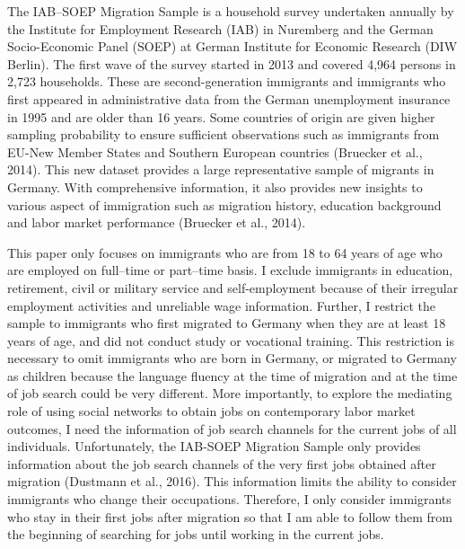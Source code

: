\documentclass[12pt,a4paper]{article}
\begin{document}
The IAB--SOEP Migration Sample is a household survey undertaken annually by the Institute for Employment Research (IAB) in Nuremberg and the German Socio-Economic Panel (SOEP) at German Institute for Economic Research (DIW Berlin). The first wave of the survey started in 2013 and covered 4,964 persons in 2,723 households. These are second-generation immigrants and immigrants who first appeared in administrative data from the German unemployment insurance in 1995 and are older than 16 years. Some countries of origin are given higher sampling probability to ensure sufficient observations such as immigrants from EU-New Member States and Southern European countries (Bruecker et al., 2014). This new dataset provides a large representative sample of migrants in Germany. With comprehensive information, it also provides new insights to various aspect of immigration such as migration history, education background and labor market performance (Bruecker et al., 2014).

This paper only focuses on immigrants who are from 18 to 64 years of age who are employed on full--time or part--time basis. I exclude immigrants in education, retirement, civil or military service and self-employment because of their irregular employment activities and unreliable wage information. Further, I restrict the sample to immigrants who first migrated to Germany when they are at least 18 years of age, and did not conduct study or vocational training. This restriction is necessary to omit immigrants who are born in Germany, or migrated to Germany as children because the language fluency at the time of migration and at the time of job search could be very different. More importantly, to explore the mediating role of using social networks to obtain jobs on contemporary labor market outcomes, I need the information of job search channels for the current jobs of all individuals. Unfortunately, the IAB-SOEP Migration Sample only provides information about the job search channels of the very first jobs obtained after migration (Dustmann et al., 2016). This information limits the ability to consider immigrants who change their occupations. Therefore, I only consider immigrants who stay in their first jobs after migration so that I am able to follow them from the beginning of searching for jobs until working in the current jobs. 
\end{document}
